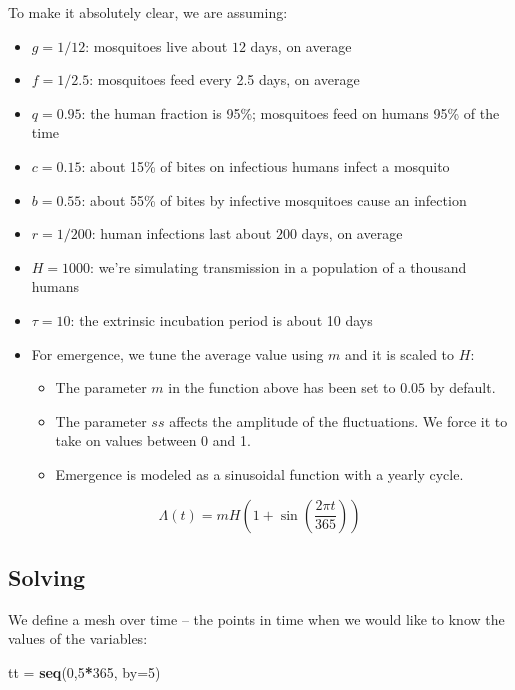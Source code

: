 \documentclass[
]{book}
\newenvironment{Shaded}{\begin{snugshade}}{\end{snugshade}}
\newcommand{\AttributeTok}[1]{\textcolor[rgb]{0.13,0.29,0.53}{#1}}
\newcommand{\DecValTok}[1]{\textcolor[rgb]{0.00,0.00,0.81}{#1}}
\newcommand{\FunctionTok}[1]{\textcolor[rgb]{0.13,0.29,0.53}{\textbf{#1}}}
\newcommand{\NormalTok}[1]{#1}
\newcommand{\OtherTok}[1]{\textcolor[rgb]{0.56,0.35,0.01}{#1}}
\newcommand{\SpecialCharTok}[1]{\textcolor[rgb]{0.81,0.36,0.00}{\textbf{#1}}}
\begin{document}
To make it absolutely clear, we are assuming:

\begin{itemize}
\item
  \(g=1/12\): mosquitoes live about \(12\) days, on average
\item
  \(f=1/2.5\): mosquitoes feed every 2.5 days, on average
\item
  \(q=0.95\): the human fraction is 95\%; mosquitoes feed on humans 95\% of the time
\item
  \(c=0.15\): about 15\% of bites on infectious humans infect a mosquito
\item
  \(b=0.55\): about 55\% of bites by infective mosquitoes cause an infection
\item
  \(r=1/200\): human infections last about \(200\) days, on average
\item
  \(H=1000\): we're simulating transmission in a population of a thousand humans
\item
  \(\tau=10\): the extrinsic incubation period is about 10 days
\item
  For emergence, we tune the average value using \(m\) and it is scaled to \(H\):

  \begin{itemize}
  \item
    The parameter \(m\) in the function above has been set to \(0.05\) by default.
  \item
    The parameter \(ss\) affects the amplitude of the fluctuations. We force it to take on values between 0 and 1.
  \item
    Emergence is modeled as a sinusoidal function with a yearly cycle.
  \end{itemize}
\end{itemize}

\[\Lambda(t) = m H \left(1 + \sin \left(\frac{2\pi t}{365}\right)\right)\]

\subsection{Solving}\label{solving-1}

We define a mesh over time -- the points in time when we would like to know the values of the variables:

\begin{Shaded}
\begin{Highlighting}[]
\NormalTok{tt }\OtherTok{=} \FunctionTok{seq}\NormalTok{(}\DecValTok{0}\NormalTok{,}\DecValTok{5}\SpecialCharTok{*}\DecValTok{365}\NormalTok{, }\AttributeTok{by=}\DecValTok{5}\NormalTok{) }
\end{Highlighting}
\end{Shaded}
\end{document}
